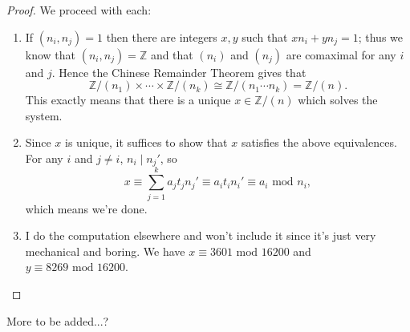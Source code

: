 \documentclass[12pt]{article}
\theoremstyle{remark}
\theoremstyle{named}
\newcommand{\Z}{\mathbb Z}
\renewcommand{\mod}{\text{ mod }}
\begin{document}
\begin{proof}
    We proceed with each:
    \begin{enumerate}
        \item If \((n_i, n_j) = 1\) then there are integers \(x, y\) such that \(xn_i + yn_j = 1\); thus we know that \((n_i, n_j) = \Z\) and that \((n_i)\) and \((n_j)\) are comaximal for any \(i\) and \(j\). Hence the Chinese Remainder Theorem gives that 
        \[\Z / (n_1) \times \cdots \times \Z / (n_k) \cong \Z / (n_1 \cdots n_k) = \Z / (n).\]
        This exactly means that there is a unique \(x \in \Z / (n)\) which solves the system. 
        \item Since \(x\) is unique, it suffices to show that \(x\) satisfies the above equivalences. For any \(i\) and \(j \neq i\), \(n_i \mid n_j'\), so 
        \[x \equiv \sum_{j = 1}^k a_j t_j n_j' \equiv a_i t_i n_i' \equiv a_i \mod{n_i},\]
        which means we're done.
        \item I do the computation elsewhere and won't include it since it's just very mechanical and boring. We have \(x \equiv 3601 \mod 16200\) and \(y \equiv 8269 \mod 16200\).
    \end{enumerate}
\end{proof}

More to be added...?
\end{document}
